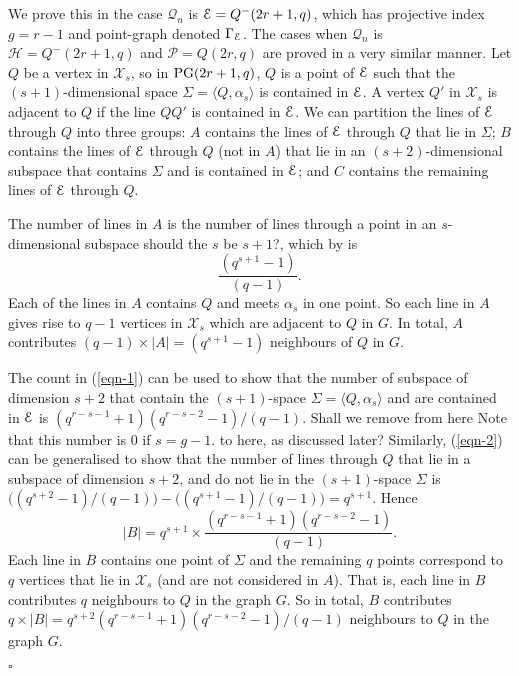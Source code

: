 \documentclass[12pt]{article}
\newenvironment{proof}{\noindent{\bf Proof}\hspace{0.5em}}
    { \null  \hfill $\square$ \par}
\newcommand{\X}{\mathcal X}
\newcommand\E{{\cal E}}
\renewcommand{\P}{\mathcal P}
\renewcommand{\H}{\mathcal H}
\newcommand{\Q}{\mathscr Q}
\newcommand\PG{{\rm PG}}
\newcommand\TODO[1]{{\color{Purple} #1}}
\begin{document}
\begin{proof} We prove this in the case $\Q_n$ is $\E=Q^-(2r+1,q)$, which has projective index $g=r-1$ and point-graph denoted $\Gamma_\E$. The cases when $\Q_n$ is $\H=Q^-(2r+1,q)$ and $\P=Q(2r,q)$ are proved in a very similar manner. 
Let $Q$ be a vertex in $\X_s$, so in $\PG(2r+1,q)$, 
$Q$ is a point of $\E$ such that the $(s+1)$-dimensional space $\Sigma=\langle Q,\alpha_s\rangle$ is contained in $\E$.
A vertex $Q'$ in $\X_s$ is adjacent to $Q$ if the line $QQ'$ is  contained in $\E$. We can partition the lines of $\E$ through $Q$ into three groups: $A$ contains the lines of $\E$ through $Q$ that lie in $\Sigma$; 
$B$ contains the lines of $\E$ through $Q$ (not in $A$) that lie in an $(s+2)$-dimensional subspace that contains $\Sigma$ and is contained in $\E$; and $C$ contains the remaining lines of $\E$ through $Q$.



The number of lines in $A$ is the number of lines through a point in an $s$-dimensional subspace \TODO{should the $s$ be $s+1$?}, which by \cite[Theorem 3.1]{hirs98} is 
\begin{equation}\label{eqn-2}
\frac{(q^{s+1}-1)}{(q-1)}.
\end{equation}
 Each of the lines in $A$ contains $Q$ and meets $\alpha_s$ in one point. So each line in $A$ gives rise to $q-1$ vertices in $\X_s$ which are adjacent to $Q$ in $G$. 
In total,  $A$ contributes $(q-1)\times |A|=(q^{s+1}-1)$ neighbours of $Q$ in $G$.

The count  in (\ref{eqn-1}) can be used to show that the number of subspace of dimension $s+2$ that contain the $(s+1)$-space $\Sigma=\langle Q,\alpha_s\rangle$  and are contained in $\E$ is 
$(q^{r-s-1}+1)(q^{r-s-2}-1)/(q-1)$. \TODO{Shall we remove from here} Note that this number is $0$ if $s=g-1$. \TODO{to here, as discussed later?} Similarly, (\ref{eqn-2}) can be generalised to show that the number of lines through $Q$ that lie in a subspace of dimension $s+2$, and do not lie in  the $(s+1)$-space $\Sigma$ is $\Big( (q^{s+2}-1)/(q-1)\Big) -\Big( (q^{s+1}-1)/(q-1)\Big) =q^{s+1}$. Hence $$|B|=q^{s+1}\times \frac{(q^{r-s-1}+1)(q^{r-s-2}-1)}{(q-1)}.$$ Each line in $B$ contains one point of $\Sigma$ and the remaining $q$ points correspond to  $q$ vertices that lie in $\X_s$ (and are not considered in $A$). That is, each line in $B$ contributes $q$ neighbours to $Q$ in the graph $G$. So in total, $B$ contributes $q\times|B|=q^{s+2}(q^{r-s-1}+1)(q^{r-s-2}-1)/(q-1)$ neighbours to $Q$ in the graph $G$. 



\end{proof}
\end{document}
